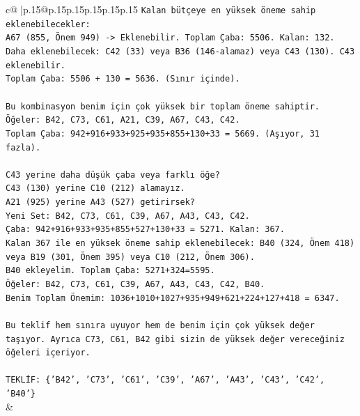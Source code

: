 \documentclass{article}
\begin{document}
{\begin{supertabular}{c@{$\;$}|p{.15\linewidth}@{}p{.15\linewidth}p{.15\linewidth}p{.15\linewidth}p{.15\linewidth}p{.15\linewidth}}
{{{\texttt{Kalan bütçeye en yüksek öneme sahip eklenebilecekler:} \\
\texttt{A67 (855, Önem 949) {-}> Eklenebilir. Toplam Çaba: 5506. Kalan: 132.} \\
\texttt{Daha eklenebilecek: C42 (33) veya B36 (146{-}alamaz) veya C43 (130). C43 eklenebilir.} \\
\texttt{Toplam Çaba: 5506 + 130 = 5636. (Sınır içinde).} \\
\\ 
\texttt{Bu kombinasyon benim için çok yüksek bir toplam öneme sahiptir.} \\
\texttt{Öğeler: B42, C73, C61, A21, C39, A67, C43, C42.} \\
\texttt{Toplam Çaba: 942+916+933+925+935+855+130+33 = 5669. (Aşıyor, 31 fazla).} \\
\\ 
\texttt{C43 yerine daha düşük çaba veya farklı öğe?} \\
\texttt{C43 (130) yerine C10 (212) alamayız.} \\
\texttt{A21 (925) yerine A43 (527) getirirsek?} \\
\texttt{Yeni Set: B42, C73, C61, C39, A67, A43, C43, C42.} \\
\texttt{Çaba: 942+916+933+935+855+527+130+33 = 5271. Kalan: 367.} \\
\texttt{Kalan 367 ile en yüksek öneme sahip eklenebilecek: B40 (324, Önem 418) veya B19 (301, Önem 395) veya C10 (212, Önem 306).} \\
\texttt{B40 ekleyelim. Toplam Çaba: 5271+324=5595.} \\
\texttt{Öğeler: B42, C73, C61, C39, A67, A43, C43, C42, B40.} \\
\texttt{Benim Toplam Önemim: 1036+1010+1027+935+949+621+224+127+418 = 6347.} \\
\\ 
\texttt{Bu teklif hem sınıra uyuyor hem de benim için çok yüksek değer taşıyor. Ayrıca C73, C61, B42 gibi sizin de yüksek değer vereceğiniz öğeleri içeriyor.} \\
\\ 
\texttt{TEKLİF: \{'B42', 'C73', 'C61', 'C39', 'A67', 'A43', 'C43', 'C42', 'B40'\}} \\
            }
        }
    }
    & \\ \\


\end{supertabular}}
\end{document}
